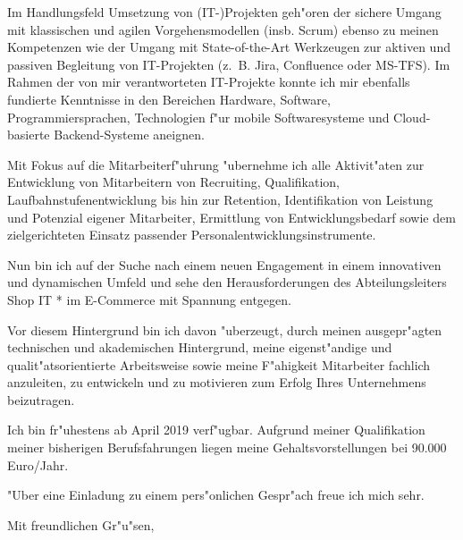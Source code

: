 \documentclass[10pt,a4paper]{dinbrief}
\begin{document}
\begin{letter}
Im Handlungsfeld Umsetzung von (IT-)Projekten geh"oren der sichere Umgang mit klassischen und agilen Vorgehensmodellen (insb. Scrum) ebenso zu meinen Kompetenzen wie der Umgang mit State-of-the-Art Werkzeugen zur aktiven und passiven Begleitung von IT-Projekten (z.~B. Jira, Confluence oder MS-TFS). Im Rahmen der von mir verantworteten IT-Projekte konnte ich mir ebenfalls fundierte Kenntnisse in den Bereichen Hardware, Software, Programmiersprachen, Technologien f"ur mobile Softwaresysteme und Cloud-basierte Backend-Systeme aneignen. 

Mit Fokus auf die Mitarbeiterf"uhrung "ubernehme ich alle Aktivit"aten zur Entwicklung von Mitarbeitern von Recruiting, Qualifikation, Laufbahnstufenentwicklung bis hin zur Retention, Identifikation von Leistung und Potenzial eigener Mitarbeiter, Ermittlung von Entwicklungsbedarf sowie dem zielgerichteten Einsatz passender Personalentwicklungsinstrumente.

Nun bin ich auf der Suche nach einem neuen Engagement in einem innovativen und dynamischen Umfeld und sehe den Herausforderungen des Abteilungsleiters Shop IT * im E-Commerce mit Spannung entgegen.

Vor diesem Hintergrund bin ich davon "uberzeugt, durch meinen ausgepr"agten technischen und akademischen Hintergrund, meine eigenst"andige und qualit"atsorientierte Arbeitsweise sowie meine F"ahigkeit Mitarbeiter fachlich anzuleiten, zu entwickeln und zu motivieren zum Erfolg Ihres Unternehmens beizutragen.

Ich bin fr"uhestens ab April 2019 verf"ugbar. Aufgrund meiner Qualifikation meiner bisherigen Berufsfahrungen liegen meine Gehaltsvorstellungen bei 90.000 Euro/Jahr. 

"Uber eine Einladung zu einem pers"onlichen Gespr"ach freue ich mich sehr.

\closing{Mit freundlichen Gr"u"sen,}
\end{letter}
\end{document}

